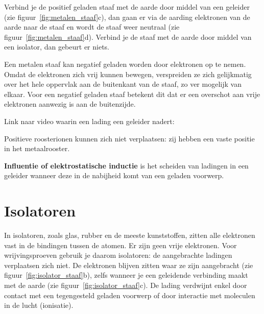 \documentclass{ximera}
\begin{document}
Verbind je de positief geladen staaf met de aarde door middel van een geleider (zie figuur~\ref{fig:metalen_staaf}c), dan gaan er via de aarding elektronen van de aarde naar de staaf en wordt de staaf weer neutraal (zie figuur~\ref{fig:metalen_staaf}d). Verbind je de staaf met de aarde door middel van een isolator, dan gebeurt er niets.

Een metalen staaf kan negatief geladen worden door elektronen op te nemen. Omdat de elektronen zich vrij kunnen bewegen, verspreiden ze zich gelijkmatig over het hele oppervlak aan de buitenkant van de staaf, zo ver mogelijk van elkaar. Voor een negatief geladen staaf betekent dit dat er een overschot aan vrije elektronen aanwezig is aan de buitenzijde.

\begin{onlineOnly}
    Link naar video waarin een lading een geleider nadert: 
\end{onlineOnly}

\begin{remark}
Positieve roosterionen kunnen zich niet verplaatsen: zij hebben een vaste positie in het metaalrooster.
\end{remark}

\begin{proposition}[foldable=true,title={Influentie of elektrostatische inductie}]\nl
    \textbf{Influentie of elektrostatische inductie} is het scheiden van ladingen in een geleider wanneer deze in de nabijheid komt van een geladen voorwerp.
\end{proposition}

\section{Isolatoren}

In isolatoren, zoals glas, rubber en de meeste kunststoffen, zitten alle elektronen vast in de bindingen tussen de atomen. Er zijn geen vrije elektronen. Voor wrijvingsproeven gebruik je daarom isolatoren: de aangebrachte ladingen verplaatsen zich niet. De elektronen blijven zitten waar ze zijn aangebracht (zie figuur~\ref{fig:isolator_staaf}b), zelfs wanneer je een geleidende verbinding maakt met de aarde (zie figuur~\ref{fig:isolator_staaf}c). De lading verdwijnt enkel door contact met een tegengesteld geladen voorwerp of door interactie met moleculen in de lucht (ionisatie).
\end{document}
